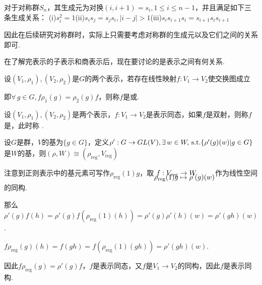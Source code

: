 对于对称群$S_n$，其生成元为对换$(i,i+1)=s_i,1\leq i\leq n-1$，并且满足如下三条生成关系：
(i)$s_i^2=1$\hspace{2em}(ii)$s_is_j=s_js_i,|i-j|>1$\hspace{2em}(iii)$s_is_{i+1}s_i=s_{i+1}s_is_{i+1}$ \par
因此在后续研究对称群时，实际上只需要考虑对称群的生成元以及它们之间的关系即可.\par
在了解完表示的子表示和商表示后，现在要讨论的是表示之间有何关系.
\begin{definition}
    设$(V_1,\rho_1),(V_2,\rho_2)$是$G$的两个表示，若存在线性映射$f:V_1\to V_2$使交换图成立 \par
    \begin{center}
    \end{center}
    即$\forall\, g\in G,f\rho_1(g)=\rho_2(g)f$，则称$f$是或.
\end{definition}
\begin{definition}
    设$(V_1,\rho_1),(V_2,\rho_2)$是两个表示，$f:V_1\to V_2$是表示同态，如果$f$是双射，则称$f$是，此时称 .
\end{definition}
\begin{instance}
    设$G$是群，$V$的基为$\{g\in G\}$，定义$\rho':G\to GL(V),\exists\, w\in W,\operatorname{\,\text{s.t.}} \{\rho'(g)(w)|g\in G\}$是$W$的基，则$(\rho,W)\cong(\rho_{\mathrm{reg}},V_{\mathrm{reg}})$\par
    注意到正则表示中的基元素可写作$\rho_\mathrm{reg}(1)g$，取$\setjot[-6]\begin{aligned}[t]
        f:V_\mathrm{reg}&\to W \\
        \rho_\mathrm{reg}(1)g&\mapsto \rho'(g)(w)
    \end{aligned} $作为线性空间的同构.\par
    那么$\rho'(g)f(h)=\rho'(g)f\left(\rho_\mathrm{reg}(1)(h)\right)=\rho'(g)\rho'(h)(w)=\rho'(gh)(w)$.\par
    $f\rho_\mathrm{reg}(g)(h)=f(gh)=f(\rho_{\mathrm{reg}}(1)(gh))=\rho'(gh)(w)$.\par
    因此$f\rho_\mathrm{reg}(g)=\rho'(g)f$，$f$是表示同态，又$f$是$V_1\to V_2$的同构，因此$f$是表示同构.
\end{instance}

